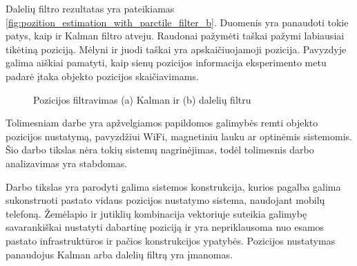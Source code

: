Dalelių filtro rezultatas yra pateikiamas \ref{fig:pozition_estimation_with_parctile_filter_b}. Duomenis yra panaudoti tokie patys, kaip ir Kalman filtro atveju. Raudonai pažymėti taškai pažymi labiausiai tikėtiną poziciją. Mėlyni ir juodi taškai yra apskaičiuojamoji pozicija. Pavyzdyje galima aiškiai pamatyti, kaip sienų pozicijos informacija eksperimento metu padarė įtaka objekto pozicijos skaičiavimams.

\begin{figure}[H]
    \label{fig:pozition_estimation_with_parctile_filter}
    \centering
    \caption{Pozicijos filtravimas (a) Kalman ir (b) dalelių filtru \cite{willemsenconcept}}
\end{figure}


Tolimesniam darbe yra apžvelgiamos papildomos galimybės remti objekto pozicijos nustatymą, pavyzdžiui WiFi, magnetiniu lauku ar optinėmis sistemomis. Šio darbo tikslas nėra tokių sistemų nagrinėjimas, todėl tolimesnis darbo analizavimas yra stabdomas.

Darbo tikslas yra parodyti galima sistemos konstrukcija, kurios pagalba galima sukonstruoti pastato vidaus pozicijos nustatymo sistema, naudojant mobilų telefoną. Žemėlapio ir jutiklių kombinacija vektoriuje suteikia galimybę savarankiškai nustatyti dabartinę poziciją ir yra nepriklausoma nuo esamos pastato infrastruktūros ir pačios konstrukcijos ypatybės. Pozicijos nustatymas panaudojus Kalman arba dalelių filtrą yra įmanomas.

